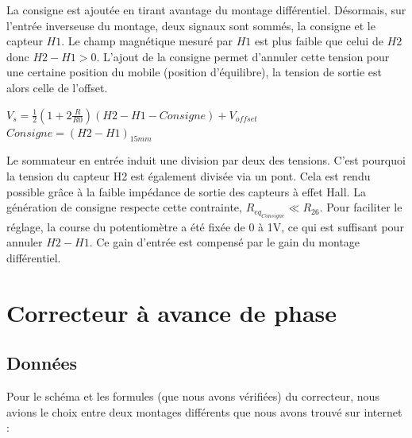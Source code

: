 \documentclass[11pt, french]{article} %
\begin{document}
La consigne est ajoutée en tirant avantage du montage différentiel. Désormais, sur l'entrée inverseuse du montage, deux signaux sont sommés, la consigne et le capteur $H1$. Le champ magnétique mesuré par $H1$ est plus faible que celui de $H2$ donc $H2-H1>0$. L'ajout de la consigne permet d'annuler cette tension pour une certaine position du mobile (position d'équilibre), la tension de sortie est alors celle de l'offset.
\begin{center}
$V_s=\frac{1}{2}(1+2 \frac{R}{R0})(H2-H1-Consigne) + V_{offset}$
$Consigne = (H2-H1)_{15mm}$
\end{center}
Le sommateur en entrée induit une division par deux des tensions. C'est pourquoi la tension du capteur H2 est également divisée via un pont. Cela est rendu possible grâce à la faible impédance de sortie des capteurs à effet Hall. La génération de consigne respecte cette contrainte, $R_{eq_{Consigne}} \ll R_{26}$. Pour faciliter le réglage, la course du potentiomètre a été fixée de 0 à 1V, ce qui est suffisant pour annuler $H2-H1$. Ce gain d'entrée est compensé par le gain du montage différentiel. 




\section{Correcteur à avance de phase}

\subsection{Données}

\noindent
Pour le schéma et les formules (que nous avons vérifiées) du correcteur, nous avions le choix entre deux montages différents que nous avons trouvé sur internet :
\end{document}
